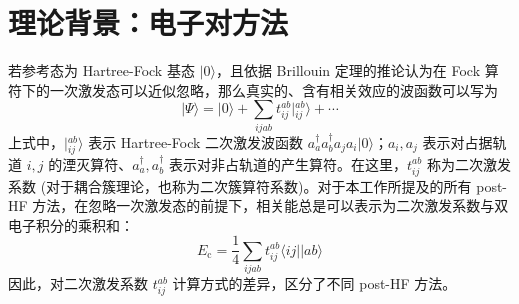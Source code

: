 \section{理论背景：电子对方法}
\label{sec.2.iepa-theory}

若参考态为 Hartree-Fock 基态 $| 0 \rangle$，且依据 Brillouin 定理的推论认为在 Fock 算符下的一次激发态可以近似忽略，那么真实的、含有相关效应的波函数可以写为
\begin{equation}
  | \Psi \rangle = | 0 \rangle + \sum_{ijab} t_{ij}^{ab} | {}_{ij}^{ab} \rangle + \cdots
\end{equation}
上式中，$| {}_{ij}^{ab} \rangle$ 表示 Hartree-Fock 二次激发波函数 $a_a^\dagger a_b^\dagger a_j a_i | 0 \rangle$；$a_i, a_j$ 表示对占据轨道 $i, j$ 的湮灭算符、$a_a^\dagger, a_b^\dagger$ 表示对非占轨道的产生算符。在这里，$t_{ij}^{ab}$ 称为二次激发系数 (对于耦合簇理论，也称为二次簇算符系数)。对于本工作所提及的所有 post-HF 方法，在忽略一次激发态的前提下，相关能总是可以表示为二次激发系数与双电子积分的乘积和：
\begin{equation}
  E_\mathrm{c} = \frac{1}{4} \sum_{ijab} t_{ij}^{ab} \langle ij || ab \rangle
\end{equation}
因此，对二次激发系数 $t_{ij}^{ab}$ 计算方式的差异，区分了不同 post-HF 方法。

